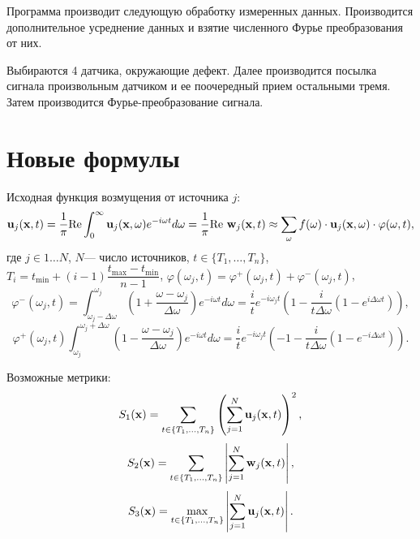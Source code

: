 \documentclass[a4paper, 12pt]{article}
\newcommand{\ww}{\omega}
\newcommand{\dw}{\Delta \omega}
\begin{document}
Программа производит следующую обработку измеренных данных. Производится   дополнительное усреднение данных и взятие численного Фурье преобразования от них.

Выбираются 4 датчика, окружающие дефект.
Далее производится посылка сигнала произвольным датчиком и ее поочередный прием остальными тремя. Затем производится Фурье-преобразование сигнала.
    
\section{Новые формулы}
Исходная функция возмущения от источника $j$:
\begin{equation*}
    {\bf u}_j({\bf x},t)=\dfrac{1}{\pi} \mathrm{Re} \int_{0}^{\infty} {\bf u}_j({\bf x},\omega) e^{- i \omega t}d\omega=\dfrac{1}{\pi} \mathrm{Re}\ {\bf w}_j ({\bf x},t)\approx \sum_{\omega} f(\omega) \cdot {\bf u}_j({\bf x},\omega) \cdot \varphi (\omega, t) ,
\end{equation*}
где $j \in 1\dots N$, $N$--- число источников, $t \in \{T_1,\dots,T_n\}$, $T_i=t_{\min}+(i-1)\dfrac{t_{\max}-t_{\min}}{n-1}$, $\varphi(\omega_j,t)=\varphi^+(\omega_j,t)+\varphi^-(\omega_j,t)$,
\begin{equation}
    \varphi^-(\omega_j,t)=  \int_{\ww_j-\dw}^{\ww_j} \left(1+ \frac{\ww-\ww_j}{\dw} \right) e^{- i \ww t}d\ww=
    \frac{i}{t} e^{- i \ww_j t}\left(1-\frac{i}{t\dw}\left( 1-e^{i \dw t} \right)  \right), 
\end{equation}
\begin{equation}
    \varphi^+(\omega_j,t) \int_{\ww_j}^{\ww_j+\dw} \left(1- \frac{\ww-\ww_j}{\dw} \right) e^{- i \ww t}d\ww=
\frac{i}{t} e^{- i \ww_j t}\left(-1-\frac{i}{t\dw}\left( 1-e^{-i \dw t} \right)  \right).
\end{equation}


Возможные метрики:
\begin{equation}
    S_1({\bf x} )= \sum_{t \in \{T_1,\dots,T_n\}} \left(\sum_{j=1}^N {\bf u}_j ({\bf x},t)\right)^2 ,
\end{equation}
\begin{equation}
    S_2({\bf x})= \sum_{t \in \{T_1,\dots,T_n\}} \left|\sum_{j=1}^N {\bf w}_j({\bf x},t)\right|,
\end{equation}
\begin{equation}
    S_3({\bf x})= \max_{t \in \{T_1,\dots,T_n\}} \left|\sum_{j=1}^N {\bf u}_j ({\bf x},t)\right|.
\end{equation}
\end{document}
